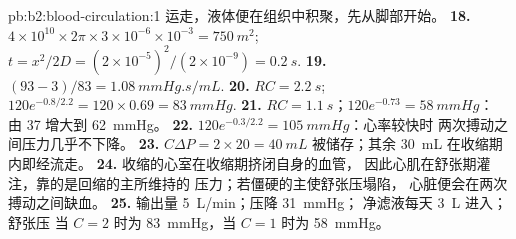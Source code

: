 \begin{solution}{pb:b2:blood-circulation:1}
运走，液体便在组织中积聚，先从脚部开始。
\textbf{18.} $4\times 10^{10}\times 2\pi\times 3\times 10^{-6}\times
10^{-3} = \qty{750}{m^2}$; $t = x^{2}/2D = (2\times 10^{-5})^{2}/
(2\times 10^{-9}) = \qty{0.2}{s}$.
\textbf{19.} $(93 - 3)/83 = \qty{1.08}{mmHg.s/mL}$.
\textbf{20.} $RC = \qty{2.2}{s}$; $120e^{-0.8/2.2} = 120\times 0.69 =
\qty{83}{mmHg}$.
\textbf{21.} $RC = \qty{1.1}{s}$；$120e^{-0.73} = \qty{58}{mmHg}$：
由 37 增大到 \qty{62}{mmHg}。
\textbf{22.} $120e^{-0.3/2.2} = \qty{105}{mmHg}$：心率较快时
两次搏动之间压力几乎不下降。
\textbf{23.} $C\Delta P = 2\times 20 = \qty{40}{mL}$ 被储存；其余
\qty{30}{mL} 在收缩期内即经流走。
\textbf{24.} 收缩的心室在收缩期挤闭自身的血管，
因此心肌在舒张期灌注，靠的是回缩的主所维持的
压力；若僵硬的主使舒张压塌陷，
心脏便会在两次搏动之间缺血。
\textbf{25.} 输出量 \qty{5}{L/min}；压降 \qty{31}{mmHg}；
净滤液每天 \qty{3}{L} 进入；舒张压
当 $C = 2$ 时为 \qty{83}{mmHg}，当 $C = 1$ 时为 \qty{58}{mmHg}。
\end{solution}
